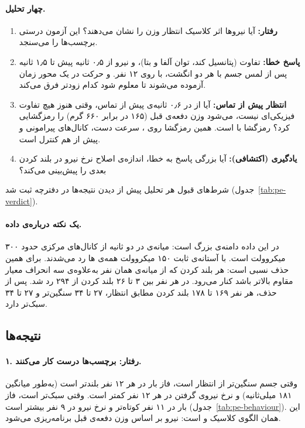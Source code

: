 \paragraph{چهار تحلیل.}
\begin{enumerate}
\item \textbf{رفتار:} آیا نیروها اثر کلاسیک انتظار وزن را نشان می‌دهند؟ این آزمون درستی برچسب‌ها را می‌سنجد.
\item \textbf{پاسخ خطا:} تفاوت  (پتانسیل کند، توان آلفا و بتا)،  و نیرو از ۰٫۵ ثانیه پیش تا ۱٫۵ ثانیه پس از لمس جسم با هر دو انگشت، با  روی ۱۲ نفر.  و حرکت در یک محور زمان آزموده می‌شوند تا معلوم شود کدام زودتر فرق می‌کند.
\item \textbf{انتظار پیش از تماس:} آیا از  در ۰٫۶ ثانیه‌ی پیش از تماس، وقتی هنوز هیچ تفاوت فیزیکی‌ای نیست، می‌شود وزن دفعه‌ی قبل (۱۶۵ در برابر ۶۶۰ گرم) را رمزگشایی کرد؟ رمزگشا  با  است. همین رمزگشا روی ، سرعت دست، کانال‌های پیرامونی و  پیش از  هم کنترل است.
\item \textbf{یادگیری (اکتشافی):} آیا بزرگی پاسخ  به خطا، اندازه‌ی اصلاح نرخ نیرو در بلند کردن بعدی را پیش‌بینی می‌کند؟
\end{enumerate}

شرط‌های قبول هر تحلیل پیش از دیدن نتیجه‌ها در دفترچه ثبت شد (جدول~\ref{tab:pe-verdict}).

\paragraph{یک نکته درباره‌ی داده.} در این داده دامنه‌ی  بزرگ است: میانه‌ی  در دو ثانیه از کانال‌های مرکزی حدود ۳۰۰ میکروولت است. با آستانه‌ی ثابت ۱۵۰ میکروولت همه‌ی ها رد می‌شدند. برای همین حذف  نسبی است: هر بلند کردن که از میانه‌ی همان نفر به‌علاوه‌ی سه انحراف معیار مقاوم بالاتر باشد کنار می‌رود. در هر نفر بین ۳ تا ۲۶ بلند کردن از ۲۹۴ رد شد. پس از حذف، هر نفر ۱۶۹ تا ۱۷۸ بلند کردن مطابق انتظار، ۲۷ تا ۳۴ سنگین‌تر و ۲۷ تا ۳۴ سبک‌تر دارد.

\subsection{نتیجه‌ها}

\paragraph{۱. رفتار: برچسب‌ها درست کار می‌کنند.} وقتی جسم سنگین‌تر از انتظار است، فاز بار در هر ۱۲ نفر بلندتر است (به‌طور میانگین ۱۸۱ میلی‌ثانیه) و نرخ نیروی گرفتن در هر ۱۲ نفر کمتر است. وقتی سبک‌تر است، فاز بار در ۱۱ نفر کوتاه‌تر و نرخ نیرو در ۹ نفر بیشتر است (جدول~\ref{tab:pe-behaviour}). این همان الگوی کلاسیک  و  است: نیرو بر اساس وزن دفعه‌ی قبل برنامه‌ریزی می‌شود.

